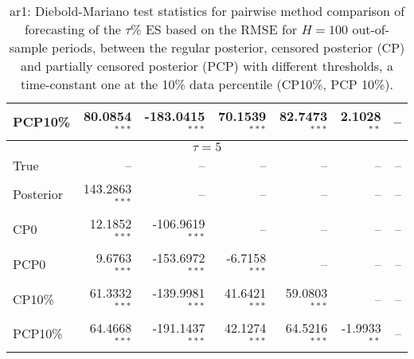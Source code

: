 {{\begin{table}
\begin{tabular}{l | rrrrrr}
PCP10\% & 80.0854$^{***}$ & -183.0415$^{***}$ & 70.1539$^{***}$ & 82.7473$^{***}$ & 2.1028$^{**}$\phantom{$^{*}$} &    --\phantom{$^{***}$}   \\ 
\hline 
\multicolumn{7}{c}{$\tau = 5$} \\ \hline 
True &    --\phantom{$^{***}$} &    --\phantom{$^{***}$} &    --\phantom{$^{***}$} &    --\phantom{$^{***}$} &    --\phantom{$^{***}$} &    --\phantom{$^{***}$}   \\ 
Posterior & 143.2863$^{***}$ &    --\phantom{$^{***}$} &    --\phantom{$^{***}$} &    --\phantom{$^{***}$} &    --\phantom{$^{***}$} &    --\phantom{$^{***}$}   \\ 
CP0 & 12.1852$^{***}$ & -106.9619$^{***}$ &    --\phantom{$^{***}$} &    --\phantom{$^{***}$} &    --\phantom{$^{***}$} &    --\phantom{$^{***}$}   \\ 
PCP0 & 9.6763$^{***}$ & -153.6972$^{***}$ & -6.7158$^{***}$ &    --\phantom{$^{***}$} &    --\phantom{$^{***}$} &    --\phantom{$^{***}$}   \\ 
CP10\% & 61.3332$^{***}$ & -139.9981$^{***}$ & 41.6421$^{***}$ & 59.0803$^{***}$ &    --\phantom{$^{***}$} &    --\phantom{$^{***}$}   \\ 
PCP10\% & 64.4668$^{***}$ & -191.1437$^{***}$ & 42.1274$^{***}$ & 64.5216$^{***}$ & -1.9933$^{**}$\phantom{$^{*}$} &    --\phantom{$^{***}$}   \\ 
\hline 
\end{tabular}
 \caption{ar1: Diebold-Mariano test statistics for pairwise method comparison  of forecasting of the $\tau$\%  ES based on  the RMSE for $H=100$ out-of-sample periods,  between  the regular posterior, censored posterior (CP) and  partially censored posterior (PCP) with different thresholds,  a time-constant one at the 10\% data percentile (CP10\%, PCP 10\%). }
\label{tab:ar1_DM_es_T10000}  
\end{table}
}}